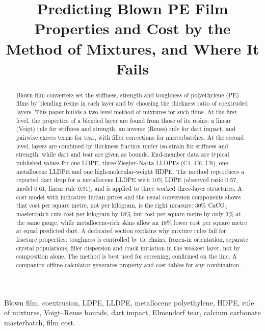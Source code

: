 \documentclass[conference,a4paper]{IEEEtran}
\begin{document}
\title{Predicting Blown PE Film Properties and Cost by the Method of Mixtures, and Where It Fails}

\author{
}

\maketitle

\begin{abstract}
Blown film converters set the stiffness, strength and toughness of polyethylene (PE) films by blending resins in each layer and by choosing the thickness ratio of coextruded layers. This paper builds a two-level method of mixtures for such films. At the first level, the properties of a blended layer are found from those of its resins: a linear (Voigt) rule for stiffness and strength, an inverse (Reuss) rule for dart impact, and pairwise excess terms for tear, with filler corrections for masterbatches. At the second level, layers are combined by thickness fraction under iso-strain for stiffness and strength, while dart and tear are given as bounds. End-member data are typical published values for one LDPE, three Ziegler--Natta LLDPEs (C4, C6, C8), one metallocene LLDPE and one high-molecular-weight HDPE. The method reproduces a reported dart drop for a metallocene LLDPE with 10\% LDPE (observed ratio 0.57, model 0.61, linear rule 0.91), and is applied to three worked three-layer structures. A cost model with indicative Indian prices and the usual conversion components shows that cost per square metre, not per kilogram, is the right measure: 30\% CaCO$_3$ masterbatch cuts cost per kilogram by 18\% but cost per square metre by only 3\% at the same gauge, while metallocene-rich skins allow an 18\% lower cost per square metre at equal predicted dart. A dedicated section explains why mixture rules fail for fracture properties: toughness is controlled by tie chains, frozen-in orientation, separate crystal populations, filler dispersion and crack initiation in the weakest layer, not by composition alone. The method is best used for screening, confirmed on the line. A companion offline calculator generates property and cost tables for any combination.
\end{abstract}

\begin{IEEEkeywords}
Blown film, coextrusion, LDPE, LLDPE, metallocene polyethylene, HDPE, rule of mixtures, Voigt--Reuss bounds, dart impact, Elmendorf tear, calcium carbonate masterbatch, film cost.
\end{IEEEkeywords}
\end{document}
